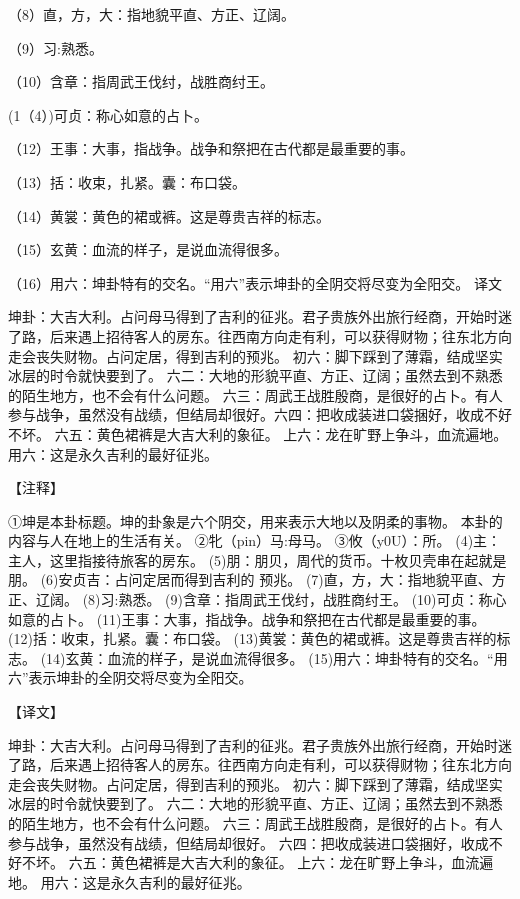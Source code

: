 \documentclass[12pt,UTF8]{ctexbook}
\begin{document}
（8）直，方，大：指地貌平直、方正、辽阔。

（9）习:熟悉。

（10）含章：指周武王伐纣，战胜商纣王。

(1（4）)可贞：称心如意的占卜。

（12）王事：大事，指战争。战争和祭把在古代都是最重要的事。

（13）括：收束，扎紧。囊：布口袋。

（14）黄裳：黄色的裙或裤。这是尊贵吉祥的标志。

（15）玄黄：血流的样子，是说血流得很多。

（16）用六：坤卦特有的交名。“用六”表示坤卦的全阴交将尽变为全阳交。
译文

坤卦：大吉大利。占问母马得到了吉利的征兆。君子贵族外出旅行经商，开始时迷了路，后来遇上招待客人的房东。往西南方向走有利，可以获得财物；往东北方向走会丧失财物。占问定居，得到吉利的预兆。 初六：脚下踩到了薄霜，结成坚实冰层的时令就快要到了。 六二：大地的形貌平直、方正、辽阔；虽然去到不熟悉的陌生地方，也不会有什么问题。 六三：周武王战胜殷商，是很好的占卜。有人参与战争，虽然没有战绩，但结局却很好。六四：把收成装进口袋捆好，收成不好不坏。 六五：黄色裙裤是大吉大利的象征。 上六：龙在旷野上争斗，血流遍地。 用六：这是永久吉利的最好征兆。


【注释】

①坤是本卦标题。坤的卦象是六个阴交，用来表示大地以及阴柔的事物。 本卦的内容与人在地上的生活有关。
②牝（pin）马:母马。
③攸（y0U）：所。
(4)主：主人，这里指接待旅客的房东。
(5)朋：朋贝，周代的货币。十枚贝壳串在起就是朋。
(6)安贞吉：占问定居而得到吉利的 预兆。
(7)直，方，大：指地貌平直、方正、辽阔。
(8)习:熟悉。
(9)含章：指周武王伐纣，战胜商纣王。
(10)可贞：称心如意的占卜。
(11)王事：大事，指战争。战争和祭把在古代都是最重要的事。
(12)括：收束，扎紧。囊：布口袋。
(13)黄裳：黄色的裙或裤。这是尊贵吉祥的标志。
(14)玄黄：血流的样子，是说血流得很多。
(15)用六：坤卦特有的交名。“用六”表示坤卦的全阴交将尽变为全阳交。

【译文】

坤卦：大吉大利。占问母马得到了吉利的征兆。君子贵族外出旅行经商，开始时迷了路，后来遇上招待客人的房东。往西南方向走有利，可以获得财物；往东北方向走会丧失财物。占问定居，得到吉利的预兆。
初六：脚下踩到了薄霜，结成坚实冰层的时令就快要到了。
六二：大地的形貌平直、方正、辽阔；虽然去到不熟悉的陌生地方，也不会有什么问题。
六三：周武王战胜殷商，是很好的占卜。有人参与战争，虽然没有战绩，但结局却很好。
六四：把收成装进口袋捆好，收成不好不坏。
六五：黄色裙裤是大吉大利的象征。
上六：龙在旷野上争斗，血流遍地。
用六：这是永久吉利的最好征兆。
\end{document}
